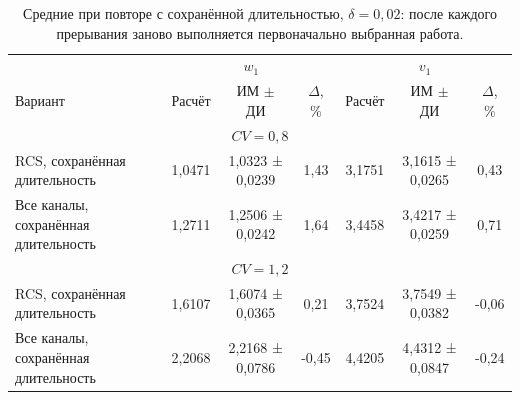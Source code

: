 \begin{table}[!htbp]
\centering\small\setlength{\tabcolsep}{3pt}
\begin{tabular}{@{}p{4.2cm}cccccc@{}}
\toprule
 & \multicolumn{3}{c}{$w_1$} & \multicolumn{3}{c}{$v_1$} \\
Вариант & Расчёт & ИМ $\pm$ ДИ & $\Delta$, \% & Расчёт & ИМ $\pm$ ДИ & $\Delta$, \% \\
\midrule
\multicolumn{7}{c}{$CV=0,8$} \\
RCS, сохранённая длительность & 1,0471 & 1,0323 ± 0,0239 & 1,43 & 3,1751 & 3,1615 ± 0,0265 & 0,43 \\
Все каналы, сохранённая длительность & 1,2711 & 1,2506 ± 0,0242 & 1,64 & 3,4458 & 3,4217 ± 0,0259 & 0,71 \\
\multicolumn{7}{c}{$CV=1,2$} \\
RCS, сохранённая длительность & 1,6107 & 1,6074 ± 0,0365 & 0,21 & 3,7524 & 3,7549 ± 0,0382 & -0,06 \\
Все каналы, сохранённая длительность & 2,2068 & 2,2168 ± 0,0786 & -0,45 & 4,4205 & 4,4312 ± 0,0847 & -0,24 \\
\bottomrule
\end{tabular}
\caption{Средние при повторе с сохранённой длительностью, $\delta=0{,}02$: после каждого прерывания заново выполняется первоначально выбранная работа.}
\label{tab:results_fixed}
\end{table}

